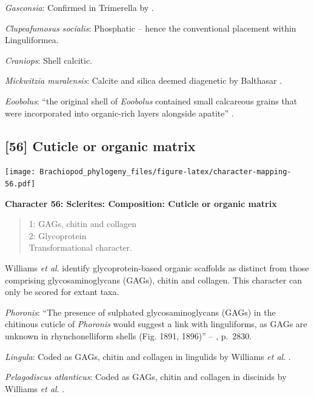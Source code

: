 \documentclass[]{book}
\theoremstyle{definition}
\theoremstyle{definition}
\theoremstyle{definition}
\theoremstyle{remark}
\begin{document}
\emph{Gasconsia}: Confirmed in Trimerella by
\citet{Balthasar2011Relicaragonite}.

\emph{Clupeafumosus socialis}: Phosphatic -- hence the conventional
placement within Linguliformea.

\emph{Craniops}: Shell calcitic.

\emph{Mickwitzia muralensis}: Calcite and silica deemed diagenetic by
Balthasar \citeyearpar{Balthasar2004Shellstructure}.

\emph{Eoobolus}: ``the original shell of \emph{Eoobolus} contained small
calcareous grains that were incorporated into organic-rich layers
alongside apatite'' \citep{Balthasar2007Anearly}.

\hypertarget{cuticle-or-organic-matrix}{%
\subsection*{{[}56{]} Cuticle or organic
matrix}\label{cuticle-or-organic-matrix}}

\texttt{[image: Brachiopod\_phylogeny\_files/figure-latex/character-mapping-56.pdf]}

\textbf{Character 56: Sclerites: Composition: Cuticle or organic matrix}

\begin{quote}
1: GAGs, chitin and collagen\\
2: Glycoprotein\\
Transformational character.
\end{quote}

Williams \emph{et al}. \citeyearpar{Williams1996Asupra} identify
glycoprotein-based organic scaffolds as distinct from those comprising
glycosaminoglycans (GAGs), chitin and collagen. This character can only
be scored for extant taxa.

\emph{Phoronis}: ``The presence of sulphated glycosaminoglycans (GAGs)
in the chitinous cuticle of \emph{Phoronis}
\citep[p.~215]{Herrmann1997Phoronida} would suggest a link with
linguliforms, as GAGs are unknown in rhynchonelliform shells (Fig. 1891,
1896)'' -- \citet{Williams2007PartH}, p.~2830.

\emph{Lingula}: Coded as GAGs, chitin and collagen in lingulids by
Williams \emph{et al}. \citeyearpar{Williams1996Asupra}.

\emph{Pelagodiscus atlanticus}: Coded as GAGs, chitin and collagen in
discinids by Williams \emph{et al}. \citeyearpar{Williams1996Asupra}.
\end{document}
